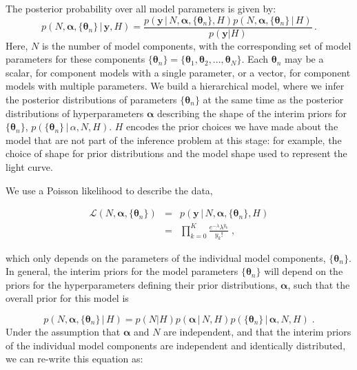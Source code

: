 \documentclass[12pt]{emulateapj}
\newcommand{\given}{\,|\,}
\newcommand{\counts}{y}
\newcommand{\likelihood}{{\mathcal L}}
\begin{document}
The posterior probability over all model parameters is given by:
\begin{equation}
p(N, \bm{\alpha},\{\bm{\theta}_n \} \given \bm{\counts}, H) = \frac{p(\bm{\counts} \given N, \bm{\alpha}, \{\bm{\theta}_n \}, H) p(N, \bm{\alpha}, \{\bm{\theta}_n \} \given H)}{p(\bm{\counts} | H)} \, .
\end{equation}
Here, $N$ is the number of model components, with the corresponding set of model parameters for these components $\{\bm{\theta}_n\} = \{ \bm{\theta}_1, \bm{\theta}_2, ..., \bm{\theta}_N \}$. Each $\bm{\theta}_n$ may be a scalar, for component models with a single parameter, or a vector, for component models with multiple parameters. 
We build a hierarchical model, where we infer the posterior distributions of parameters $\{\bm{\theta}_n\}$ at the same time as the posterior distributions of hyperparameters $\bm{\alpha}$ describing the shape
of the interim priors for  $\{\bm{\theta}_n\}$, $p(\{\bm{\theta}_n\}\given \alpha, N, H)$.
$H$ encodes the prior choices we have
made about the model that are not part of the inference problem at this stage: for example, the choice of shape for prior distributions and the model shape used to represent the light curve.

We use a Poisson likelihood to describe the data,

\begin{eqnarray}
\likelihood(N, \bm{\alpha}, \{\bm{\theta}_n \}) & = & p(\bm{\counts} \given N, \bm{\alpha}, \{\bm{\theta}_n \}, H) \\ \nonumber
 &= & \prod\limits_{k=0}^{K}{ \frac{e^{-\lambda} \lambda^{y_k} }{y_k! }} \; ,
\end{eqnarray}

which only depends on the parameters of the individual model components, $\{\bm{\theta}_n\}$. In general, the interim priors for the model 
parameters $\{\bm{\theta}_n\}$ will depend on the priors for the hyperparameters defining their prior distributions, $\bm{\alpha}$, such that the
overall prior for this model is

\begin{equation}
p(N, \bm{\alpha}, \{\bm{\theta}_n \} \given H) = p(N | H)p(\bm{\alpha}\given N, H)p(\{\bm{\theta}_n\}\given \bm{\alpha}, N, H) \; .
\end{equation}
Under the assumption that $\bm{\alpha}$ and $N$ are independent, and that the interim priors of the individual model components are
independent and identically distributed, we can re-write this equation as:
\end{document}
